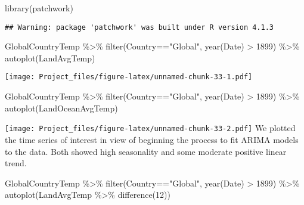 \documentclass[
]{article}
\newenvironment{Shaded}{\begin{snugshade}}{\end{snugshade}}
\newcommand{\DecValTok}[1]{\textcolor[rgb]{0.00,0.00,0.81}{#1}}
\newcommand{\FunctionTok}[1]{\textcolor[rgb]{0.00,0.00,0.00}{#1}}
\newcommand{\NormalTok}[1]{#1}
\newcommand{\SpecialCharTok}[1]{\textcolor[rgb]{0.00,0.00,0.00}{#1}}
\newcommand{\StringTok}[1]{\textcolor[rgb]{0.31,0.60,0.02}{#1}}
\begin{document}
\begin{Shaded}
\begin{Highlighting}[]
\FunctionTok{library}\NormalTok{(patchwork)}
\end{Highlighting}
\end{Shaded}

\begin{verbatim}
## Warning: package 'patchwork' was built under R version 4.1.3
\end{verbatim}

\begin{Shaded}
\begin{Highlighting}[]
\NormalTok{GlobalCountryTemp }\SpecialCharTok{\%\textgreater{}\%}  \FunctionTok{filter}\NormalTok{(Country}\SpecialCharTok{==}\StringTok{"Global"}\NormalTok{,  }\FunctionTok{year}\NormalTok{(Date) }\SpecialCharTok{\textgreater{}} \DecValTok{1899}\NormalTok{) }\SpecialCharTok{\%\textgreater{}\%} 
\FunctionTok{autoplot}\NormalTok{(LandAvgTemp)}
\end{Highlighting}
\end{Shaded}

\texttt{[image: Project\_files/figure-latex/unnamed-chunk-33-1.pdf]}

\begin{Shaded}
\begin{Highlighting}[]
\NormalTok{GlobalCountryTemp }\SpecialCharTok{\%\textgreater{}\%}  \FunctionTok{filter}\NormalTok{(Country}\SpecialCharTok{==}\StringTok{"Global"}\NormalTok{,  }\FunctionTok{year}\NormalTok{(Date) }\SpecialCharTok{\textgreater{}} \DecValTok{1899}\NormalTok{) }\SpecialCharTok{\%\textgreater{}\%} 
\FunctionTok{autoplot}\NormalTok{(LandOceanAvgTemp)}
\end{Highlighting}
\end{Shaded}

\texttt{[image: Project\_files/figure-latex/unnamed-chunk-33-2.pdf]} We
plotted the time series of interest in view of beginning the process to
fit ARIMA models to the data. Both showed high seasonality and some
moderate positive linear trend.

\begin{Shaded}
\begin{Highlighting}[]
\NormalTok{GlobalCountryTemp }\SpecialCharTok{\%\textgreater{}\%}  \FunctionTok{filter}\NormalTok{(Country}\SpecialCharTok{==}\StringTok{"Global"}\NormalTok{,  }\FunctionTok{year}\NormalTok{(Date) }\SpecialCharTok{\textgreater{}} \DecValTok{1899}\NormalTok{) }\SpecialCharTok{\%\textgreater{}\%} 
\FunctionTok{autoplot}\NormalTok{(LandAvgTemp }\SpecialCharTok{\%\textgreater{}\%} \FunctionTok{difference}\NormalTok{(}\DecValTok{12}\NormalTok{))}
\end{Highlighting}
\end{Shaded}
\end{document}
